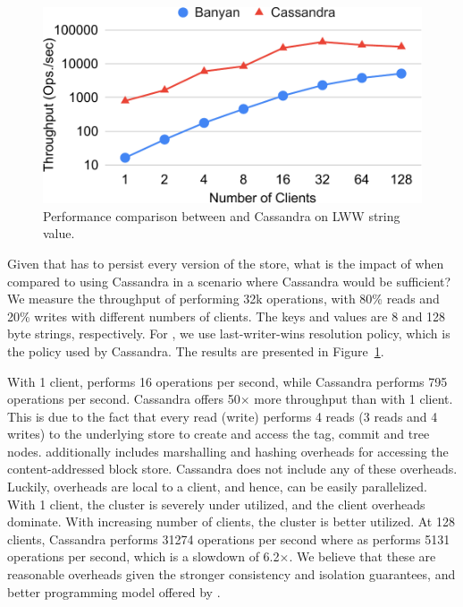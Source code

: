 \begin{figure}
	\vspace{-1cm}
	\includegraphics[scale=0.40]{results/baseline}
	\caption{Performance comparison between \name and Cassandra on LWW string
	value.}
	\label{res:baseline}
	\vspace{-0.5cm}
\end{figure}
Given that \name has to persist every version of the store, what is the impact
of \name when compared to using Cassandra in a scenario where Cassandra would
be sufficient? We measure the throughput of performing 32k operations, with
80\% reads and 20\% writes with different numbers of clients. The keys and
values are 8 and 128 byte strings, respectively. For \name, we use
last-writer-wins resolution policy, which is the policy used by Cassandra. The
results are presented in Figure~\ref{res:baseline}.

With 1 client, \name performs 16 operations per second, while Cassandra
performs 795 operations per second. Cassandra offers 50$\times$ more throughput
than \name with 1 client. This is due to the fact that every read (write)
performs 4 reads (3 reads and 4 writes) to the underlying store to create and
access the tag, commit and tree nodes. \name additionally includes marshalling
and hashing overheads for accessing the content-addressed block store.
Cassandra does not include any of these overheads. Luckily, \name overheads are
local to a client, and hence, can be easily parallelized. With 1 client, the
cluster is severely under utilized, and the client overheads dominate. With
increasing number of clients, the cluster is better utilized. At 128 clients,
Cassandra performs 31274 operations per second where as \name performs 5131
operations per second, which is a slowdown of 6.2$\times$. We believe that
these are reasonable overheads given the stronger consistency and isolation
guarantees, and better programming model offered by \name.

